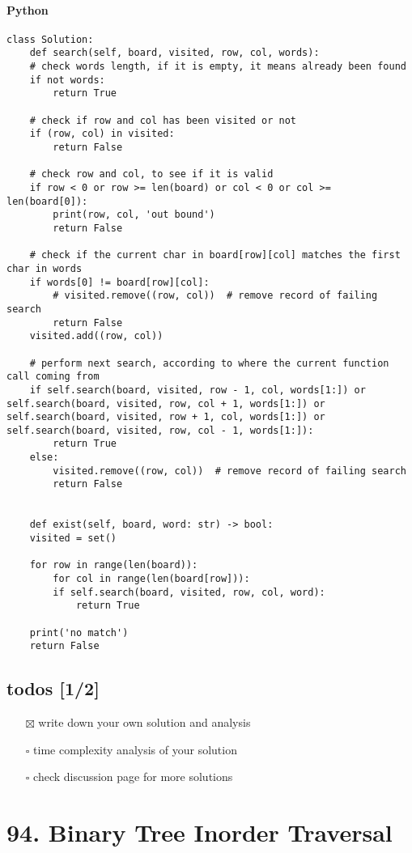 \documentclass[12pt]{article}
\begin{document}
\paragraph{Python}
\label{sec:org6251e02}
\begin{verbatim}
class Solution:
    def search(self, board, visited, row, col, words):
	# check words length, if it is empty, it means already been found
	if not words:
	    return True

	# check if row and col has been visited or not
	if (row, col) in visited:
	    return False

	# check row and col, to see if it is valid
	if row < 0 or row >= len(board) or col < 0 or col >= len(board[0]):
	    print(row, col, 'out bound')
	    return False

	# check if the current char in board[row][col] matches the first char in words
	if words[0] != board[row][col]:
	    # visited.remove((row, col))  # remove record of failing search
	    return False
	visited.add((row, col))

	# perform next search, according to where the current function call coming from
	if self.search(board, visited, row - 1, col, words[1:]) or self.search(board, visited, row, col + 1, words[1:]) or self.search(board, visited, row + 1, col, words[1:]) or self.search(board, visited, row, col - 1, words[1:]):
	    return True
	else:
	    visited.remove((row, col))  # remove record of failing search
	    return False


    def exist(self, board, word: str) -> bool:
	visited = set()

	for row in range(len(board)):
	    for col in range(len(board[row])):
		if self.search(board, visited, row, col, word):
		    return True

	print('no match')
	return False
\end{verbatim}
\subsection{todos [1/2]}
\label{sec:orgaab7fb1}
\begin{itemize}
\item[{$\boxtimes$}] write down your own solution and analysis
\item[{$\square$}] time complexity analysis of your solution
\item[{$\square$}] check discussion page for more solutions
\end{itemize}
\section{94. Binary Tree Inorder Traversal}
\label{sec:org3763976}
\end{document}
